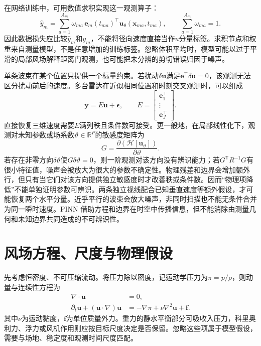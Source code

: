 在网络训练中，可用数值求积实现这一观测算子：
\begin{equation}
 \widehat y_m=\sum_{a=1}^{A_m}\omega_{ma}\,
 \mathbf e_m(t_{ma})^\top\mathbf u_\theta(\mathbf x_{ma},t_{ma}),
 \qquad \sum_{a=1}^{A_m}\omega_{ma}=1.
\end{equation}
因此数据损失应比较$\widehat y_m$和$y_m$，不能将径向速度直接当作$u$分量标签。求积节点和权重来自测量模型，不是任意增加的训练标签。忽略体积平均时，模型可能以过于平滑的局部风场解释距离门观测，也可能把未分辨的剪切错误归因于噪声。

单条波束在某个位置只提供一个标量约束。若扰动$\delta\mathbf u$满足$\mathbf e^\top\delta\mathbf u=0$，该观测无法区分扰动前后的速度。多台雷达在近似相同位置和时刻交叉观测时，可以组成
\begin{equation}
 \mathbf y=E\mathbf u+\boldsymbol\epsilon,\qquad
 E=\begin{bmatrix}\mathbf e_1^\top\\ \vdots\\ \mathbf e_J^\top\end{bmatrix}.
\end{equation}
直接恢复三维速度需要$E$满列秩且条件数可接受。更一般地，在局部线性化下，观测对未知参数或场系数$\vartheta\in\mathbb R^P$的敏感度矩阵为
\[
G=\frac{\partial(\mathcal H[\mathbf u_\vartheta])}{\partial\vartheta}.
\]
若存在非零方向$\delta\vartheta$使$G\delta\vartheta=0$，则一阶观测对该方向没有辨识能力；若$G^{\mathsf T}R^{-1}G$有很小特征值，噪声会被放大为很大的参数不确定性。物理残差和边界会增加额外行，但只有当它们对该方向提供独立敏感度时才改善秩或条件数。因而“物理项降低”不能单独证明参数可辨识。两条独立视线配合已知垂直速度等额外假设，才可能恢复两个水平分量。近乎平行的波束会放大噪声，非同时扫描也不能无条件合并为同一瞬时速度。PINN 借助方程和边界在时空中传播信息，但不能消除由测量几何和未知边界共同造成的不可辨识性。

\section{风场方程、尺度与物理假设}
\label{sec:pinn-physics}
先考虑恒密度、不可压缩流动。将压力除以密度，记运动学压力为$\pi=p/\rho$，则动量与连续性方程为
\begin{align}
 \nabla\cdot\mathbf u&=0,\\
 \partial_t\mathbf u+(\mathbf u\cdot\nabla)\mathbf u
 &=-\nabla\pi+\nu\nabla^2\mathbf u+\mathbf f.
\end{align}
其中$\nu$为运动黏度，$\mathbf f$为单位质量外力。重力的静水平衡部分可吸收入压力，科里奥利力、浮力或风机作用则应按目标尺度决定是否保留。忽略这些项属于模型假设，需要与场地、稳定度和观测时间尺度匹配。

